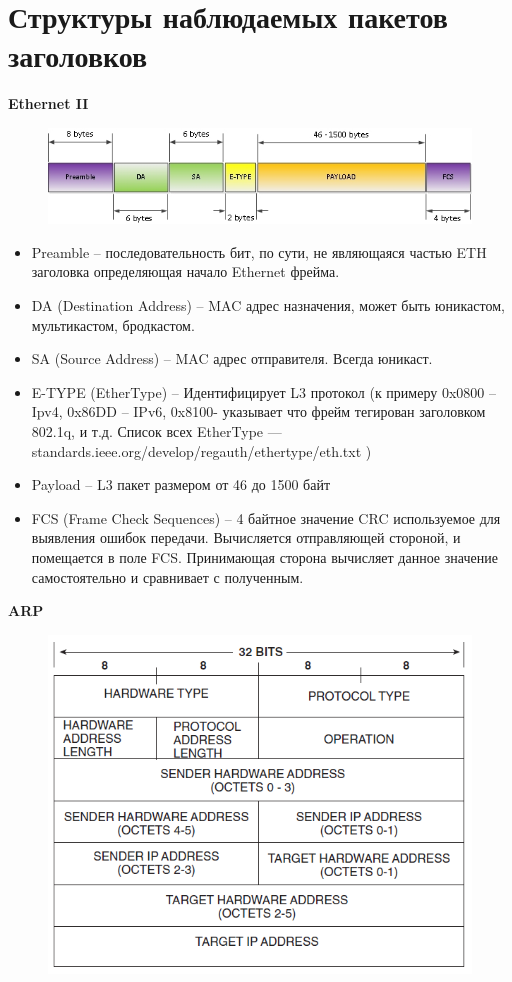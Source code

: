 \documentclass[12pt,onecolumn]{article}
\begin{document}
\section{Структуры наблюдаемых пакетов заголовков}
\textbf{Ethernet II}
\begin{figure}[H]
    \centering
    \includegraphics*[width=\textwidth]{image/part10/ethernet2.jpeg}
\end{figure}
\begin{itemize}
    \item Preamble – последовательность бит, по сути, не являющаяся частью ETH заголовка определяющая начало Ethernet фрейма.
    \item DA (Destination Address) – MAC адрес назначения, может быть юникастом, мультикастом, бродкастом.
    \item SA (Source Address) – MAC адрес отправителя. Всегда юникаст.
    \item E-TYPE (EtherType) – Идентифицирует L3 протокол (к примеру 0x0800 – Ipv4, 0x86DD – IPv6, 0x8100- указывает что фрейм тегирован заголовком 802.1q, и т.д. Список всех EtherType — standards.ieee.org/develop/regauth/ethertype/eth.txt )
    \item Payload – L3 пакет размером от 46 до 1500 байт
    \item FCS (Frame Check Sequences) – 4 байтное значение CRC используемое для выявления ошибок передачи. Вычисляется отправляющей стороной, и помещается в поле FCS. Принимающая сторона вычисляет данное значение самостоятельно и сравнивает с полученным.
\end{itemize}
\textbf{ARP}
\begin{figure}[H]
    \centering
    \includegraphics*[width=\textwidth]{image/part10/arp.png}
\end{figure}
\end{document}
